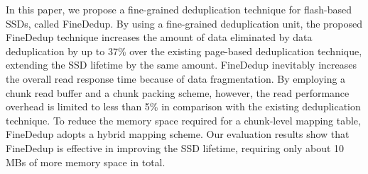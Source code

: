 In this paper, we propose a fine-grained deduplication technique for flash-based SSDs, called FineDedup.
By using a fine-grained deduplication unit,
the proposed FineDedup technique increases the amount of data eliminated 
by data deduplication by up to 37\% over the existing page-based deduplication technique,
extending the SSD lifetime by the same amount.
FineDedup inevitably increases the overall read response time because of data fragmentation.
By employing a chunk read buffer and a chunk packing scheme,
however, the read performance overhead is limited to less than 5\% 
in comparison with the existing deduplication technique.
To reduce the memory space required for a chunk-level mapping table,
FineDedup adopts a hybrid mapping scheme.
Our evaluation results show that 
FineDedup is effective in improving the SSD lifetime,
requiring only about 10 MBs of more memory space in total.

